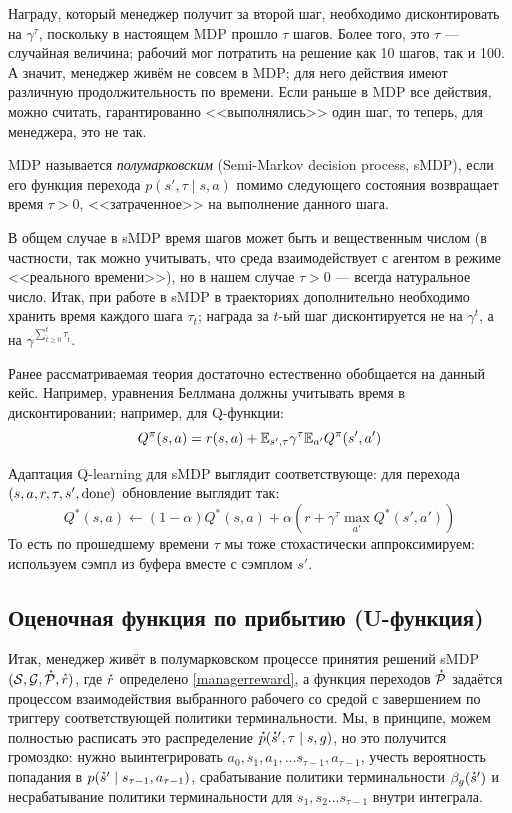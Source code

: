 Награду, который менеджер получит за второй шаг, необходимо дисконтировать на $\gamma^{\tau}$, поскольку в настоящем MDP прошло $\tau$ шагов. Более того, это $\tau$ --- случайная величина; рабочий мог потратить на решение как 10 шагов, так и 100. А значит, менеджер живём не совсем в MDP; для него действия имеют различную продолжительность по времени. Если раньше в MDP все действия, можно считать, гарантированно <<выполнялись>> один шаг, то теперь, для менеджера, это не так.

\begin{definition}
MDP называется \emph{полумарковским} (Semi-Markov decision process, sMDP), если его функция перехода $p(s', \tau \mid s, a)$ помимо следующего состояния возвращает время $\tau > 0$, <<затраченное>> на выполнение данного шага. 
\end{definition}

В общем случае в sMDP время шагов может быть и вещественным числом (в частности, так можно учитывать, что среда взаимодействует с агентом в режиме <<реального времени>>), но в нашем случае $\tau > 0$ --- всегда натуральное число. Итак, при работе в sMDP в траекториях дополнительно необходимо хранить время каждого шага $\tau_t$; награда за $t$-ый шаг дисконтируется не на $\gamma^t$, а на $\gamma^{\sum_{\hat{t} \ge 0}^t \tau_{\hat{t}}}$.

Ранее рассматриваемая теория достаточно естественно обобщается на данный кейс. Например, уравнения Беллмана должны учитывать время в дисконтировании; например, для Q-функции:
$$Q^\pi(s, a) = r(s, a) + \mathbb{E}_{s', \tau} \gamma^\tau \mathbb{E}_{a'} Q^\pi(s', a')$$

Адаптация Q-learning для sMDP выглядит соответствующе: для перехода $(s, a, r, \tau, s', \mathrm{done})$ обновление выглядит так:
$$Q^*(s, a) \leftarrow (1 - \alpha) Q^*(s, a) + \alpha \left(r + \gamma^\tau \max_{a'} Q^*(s', a') \right)$$
То есть по прошедшему времени $\tau$ мы тоже стохастически аппроксимируем: используем сэмпл из буфера вместе с сэмплом $s'$.

\subsection{Оценочная функция по прибытию (U-функция)}

Итак, менеджер живёт в полумарковском процессе принятия решений sMDP $(\mathcal{S}, \mathcal{G}, \accentset{\star}{\mathcal{P}}, \accentset{\star}{r})$, где $\accentset{\star}{r}$ определено \eqref{managerreward}, а функция переходов $\accentset{\star}{\mathcal{P}}$ задаётся процессом взаимодействия выбранного рабочего со средой с завершением по триггеру соответствующей политики терминальности. Мы, в принципе, можем полностью расписать это распределение $\accentset{\star}{p}(\accentset{\star}{s}', \tau \mid s, g)$, но это получится громоздко: нужно выинтегрировать $a_0, s_1, a_1, \dots s_{\tau - 1}, a_{\tau - 1}$, учесть вероятность попадания в $p(\accentset{\star}{s}' \mid s_{\tau - 1}, a_{\tau - 1})$, срабатывание политики терминальности $\beta_g(\accentset{\star}{s}')$ и несрабатывание политики терминальности для $s_1, s_2 \dots s_{\tau - 1}$ внутри интеграла.

